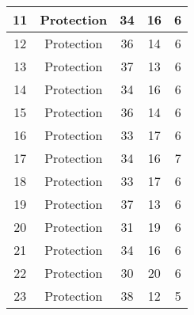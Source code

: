 \documentclass[results.tex]{subfiles}
\begin{document}
\begin{center}
\begin{tabular}{| c || c | c | c | c |}
            \hline
            11                      & Protection                   & 34                     & 16                      & 6                    \\
            \hline
            12                      & Protection                   & 36                     & 14                      & 6                    \\
            \hline
            13                      & Protection                   & 37                     & 13                      & 6                    \\
            \hline
            14                      & Protection                   & 34                     & 16                      & 6                    \\
            \hline
            15                      & Protection                   & 36                     & 14                      & 6                    \\
            \hline
            16                      & Protection                   & 33                     & 17                      & 6                    \\
            \hline
            17                      & Protection                   & 34                     & 16                      & 7                    \\
            \hline
            18                      & Protection                   & 33                     & 17                      & 6                    \\
            \hline
            19                      & Protection                   & 37                     & 13                      & 6                    \\
            \hline
            20                      & Protection                   & 31                     & 19                      & 6                    \\
            \hline
            21                      & Protection                   & 34                     & 16                      & 6                    \\
            \hline
            22                      & Protection                   & 30                     & 20                      & 6                    \\
            \hline
            23                      & Protection                   & 38                     & 12                      & 5                    \\

\end{tabular}
\end{center}
\end{document}
